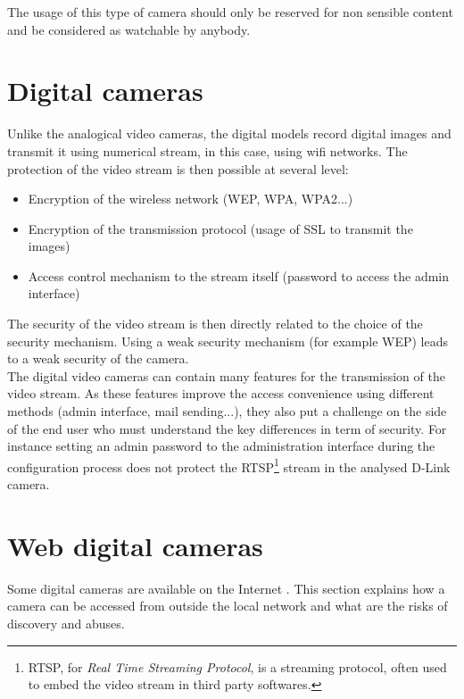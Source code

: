 The usage of this type of camera should only be reserved for non sensible content and be considered as watchable by anybody.

\section{Digital cameras}
\label{sec:cam-digital}

Unlike the analogical video cameras, the digital models record digital images and transmit it using numerical stream, in this case, using wifi networks.
The protection of the video stream is then possible at several level:\\

\begin{itemize}
\item Encryption of the wireless network (WEP, WPA, WPA2...)
\item Encryption of the transmission protocol (usage of SSL to transmit the images)
\item Access control mechanism to the stream itself (password to access the admin interface)
\end{itemize}

The security of the video stream is then directly related to the choice of the security mechanism.
Using a weak security mechanism (for example WEP) leads to a weak security of the camera.\\

The digital video cameras can contain many features for the transmission of the video stream.
As these features improve the access convenience using different methods (admin interface, mail sending...), they also put a challenge on the side of the end user who must understand the key differences in term of security.
For instance setting an admin password to the administration interface during the configuration process does not protect the RTSP\footnote{RTSP, for \emph{Real Time Streaming Protocol}, is a streaming protocol, often used to embed the video stream in third party softwares.} stream in the analysed D-Link camera.

\section{Web digital cameras}
\label{sec:cam-google}

Some digital cameras are available on the Internet .
This section explains how a camera can be accessed from outside the local network and what are the risks of discovery and abuses.

